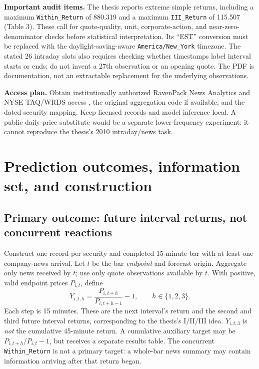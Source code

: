 \documentclass[11pt,letterpaper]{article}
\begin{document}
\textbf{Important audit items.} The thesis reports extreme simple returns, including a maximum \texttt{Within\_Return} of 880.319 and a maximum \texttt{III\_Return} of 115.507 (Table 3). These call for quote-quality, unit, corporate-action, and near-zero-denominator checks before statistical interpretation. Its ``EST'' conversion must be replaced with the daylight-saving-aware \texttt{America/New\_York} timezone. The stated 26 intraday slots also requires checking whether timestamps label interval starts or ends; do not invent a 27th observation or an opening quote. The PDF is documentation, not an extractable replacement for the underlying observations.

\textbf{Access plan.} Obtain institutionally authorized RavenPack News Analytics \cite{ravenpack} and NYSE TAQ/WRDS access \cite{taq}, the original aggregation code if available, and the dated security mapping. Keep licensed records and model inference local. A public daily-price substitute would be a separate lower-frequency experiment: it cannot reproduce the thesis's 2010 intraday/news task.

\section{Prediction outcomes, information set, and construction}
\subsection{Primary outcome: future interval returns, not concurrent reactions}
Construct one record per security and completed 15-minute bar with at least one company-news arrival. Let $t$ be the bar \emph{endpoint} and forecast origin. Aggregate only news received by $t$; use only quote observations available by $t$. With positive, valid endpoint prices $P_{i,t}$, define
\begin{equation}
Y_{i,t,h}=\frac{P_{i,t+h}}{P_{i,t+h-1}}-1,\qquad h\in\{1,2,3\}.
\label{eq:target}
\end{equation}
Each step is 15 minutes. These are the next interval's return and the second and third future interval returns, corresponding to the thesis's I/II/III idea. $Y_{i,t,3}$ is \emph{not} the cumulative 45-minute return. A cumulative auxiliary target may be $P_{i,t+h}/P_{i,t}-1$, but receives a separate results table. The concurrent \texttt{Within\_Return} is not a primary target: a whole-bar news summary may contain information arriving after that return began.
\end{document}
